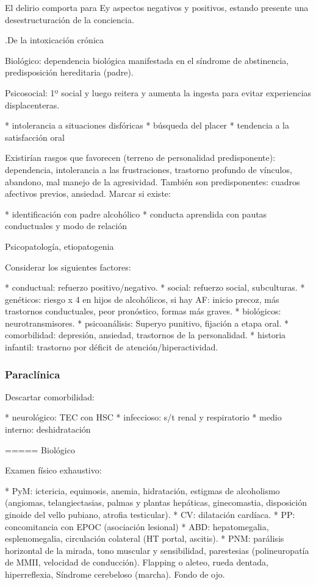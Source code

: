 \documentclass[encares.tex]{subfiles}
\begin{document}
El delirio comporta para Ey aspectos negativos y positivos, estando presente una desestructuración de la conciencia.

.De la intoxicación crónica

Biológico: dependencia biológica manifestada en el síndrome de abstinencia, predisposición hereditaria (padre).

Psicosocial: 1º social y luego reitera y aumenta la ingesta para evitar experiencias displacenteras.

* intolerancia a situaciones disfóricas
* búsqueda del placer
* tendencia a la satisfacción oral

Existirían rasgos que favorecen (terreno de personalidad predisponente): dependencia, intolerancia a las frustraciones, trastorno profundo de vínculos, abandono, mal manejo de la agresividad. También son predisponentes: cuadros afectivos previos, ansiedad. Marcar si existe:

* identificación con padre alcohólico
* conducta aprendida con pautas conductuales y modo de relación

Psicopatología, etiopatogenia

Considerar los siguientes factores:

* conductual: refuerzo positivo/negativo.
* social: refuerzo social, subculturas.
* genéticos: riesgo x 4 en hijos de alcohólicos, si hay AF: inicio precoz, más trastornos conductuales, peor pronóstico, formas más graves.
* biológicos: neurotransmisores.
* psicoanálisis: Superyo punitivo, fijación a etapa oral.
* comorbilidad: depresión, ansiedad, trastornos de la personalidad.
* historia infantil: trastorno por déficit de atención/hiperactividad.

\subsubsection*{Paraclínica}

Descartar comorbilidad:

* neurológico: TEC con HSC
* infeccioso: s/t renal y respiratorio
* medio interno: deshidratación

===== Biológico

Examen físico exhaustivo:

* PyM: ictericia, equimosis, anemia, hidratación, estigmas de alcoholismo (angiomas, telangiectasias, palmas y plantas hepáticas, ginecomastia, disposición ginoide del vello pubiano, atrofia testicular).
* CV: dilatación cardíaca.
* PP: concomitancia con EPOC (asociación lesional)
* ABD: hepatomegalia, esplenomegalia, circulación colateral (HT portal, ascitis).
* PNM: parálisis horizontal de la mirada, tono muscular y sensibilidad, parestesias (polineuropatía de MMII, velocidad de conducción). Flapping o aleteo, rueda dentada, hiperreflexia, Síndrome cerebeloso (marcha). Fondo de ojo.
\end{document}
